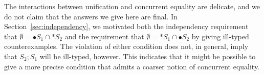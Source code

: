 The interactions between unification and concurrent equality are
delicate, and we do not claim that the answers we give here are
final. In Section~\ref{sec:independency}, we motivated both the
independency requirement that $\emptyset = {\bullet}S_1 \cap
{\ast}S_2$ and the requirement that $\emptyset = {\ast}S_1 \cap
{\bullet}S_2$ by giving ill-typed counterexamples. The violation of
either condition does not, in general, imply that $S_2; S_1$ will be
ill-typed, however. This indicates that it might be possible to give a
more precise condition that admits a coarser notion of concurrent
equality.










